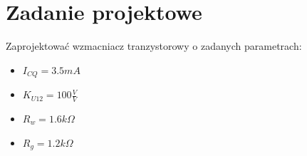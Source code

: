 \documentclass[a4paper,12pt]{article}
\begin{document}
\section{Zadanie projektowe}
Zaprojektować wzmacniacz tranzystorowy o zadanych parametrach:
\begin{itemize}
\item $ I_{CQ}=3.5mA$
\item $ K_{U12}=100 \frac{V}{V}$
\item  $ R_w= 1.6 k\Omega$
\item  $R_g=1.2 k\Omega$
\end{itemize}
\end{document}
